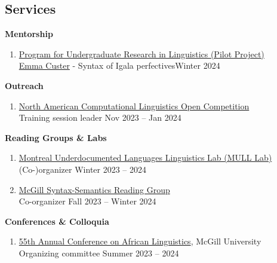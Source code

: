 \documentclass[margin,line]{resume}
\begin{document}
\begin{resume}
\begin{comment}
	\vspace{-0.6em}\rule{\textwidth}{0.4pt}
	\end{comment}


	\section{\mysidestyle Services}


	\textbf{Mentorship}
	\begin{enumerate}[-, leftmargin=1em, topsep=4pt]
		\item[] \href{https://www.mcgill.ca/cogsci/research/cogs396}{Program for Undergraduate Research in Linguistics (Pilot Project)}\\
		      \hphantom{...}\href{https://www.linkedin.com/in/emma-custer-648345252}{Emma Custer} - Syntax of Igala perfectives\hfill Winter 2024
	\end{enumerate}

	\textbf{Outreach}
	\begin{enumerate}[-, leftmargin=1em, topsep=4pt]
		\item[] \href{https://naclo.org/}{North American Computational Linguistics Open Competition}\\
		      \hphantom{...}Training session leader \hfill Nov 2023 -- Jan 2024
	\end{enumerate}

	\textbf{Reading Groups \& Labs}
	\begin{enumerate}[-, leftmargin=1em, topsep=4pt]
		\item[] \href{https://mcling.blogs.mcgill.ca/category/mull-lab/}{Montreal Underdocumented Languages Linguistics Lab (MULL Lab)}\\
		      \hphantom{...}(Co-)organizer \hfill Winter 2023 -- 2024

		\item[] \href{https://mcling.blogs.mcgill.ca/category/syntax-semantics-group/}{McGill Syntax-Semantics Reading Group}\\
		      \hphantom{...}Co-organizer \hfill Fall 2023 -- Winter 2024
	\end{enumerate}

	\textbf{Conferences \& Colloquia}
	\begin{enumerate}[-, leftmargin=1em, topsep=4pt]
		\item[] \href{https://acal55.mull-lab.org/}{55th Annual Conference on African Linguistics}, McGill University\\
		      \hphantom{...}Organizing committee \hfill Summer 2023 -- 2024


\end{enumerate}
\end{resume}
\end{document}
